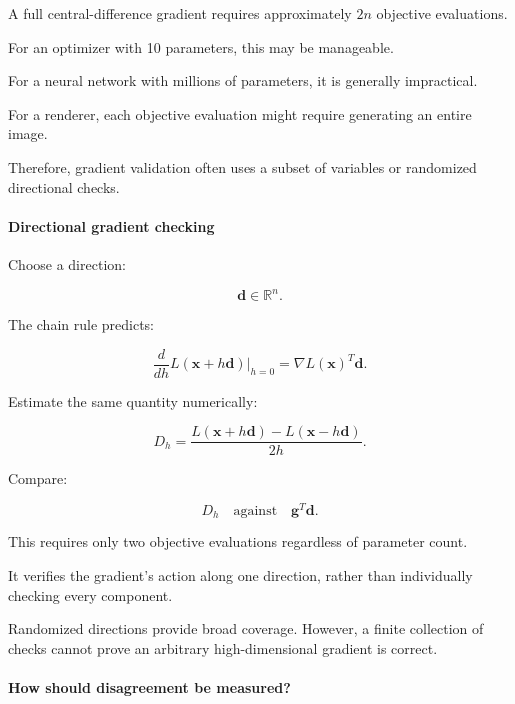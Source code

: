 \hypertarget{02-foundations-ii-ch022-why-checking-an-entire-gradient-can-be-expensive}{}

A full central-difference gradient requires approximately \(2n\) objective evaluations.

For an optimizer with 10 parameters, this may be manageable.

For a neural network with millions of parameters, it is generally impractical.

For a renderer, each objective evaluation might require generating an entire image.

Therefore, gradient validation often uses a subset of variables or randomized directional checks.

\paragraph{Directional gradient checking}\label{02-foundations-ii-ch022-directional-gradient-checking}

\hypertarget{02-foundations-ii-ch022-directional-gradient-checking}{}

Choose a direction:

\[
\mathbf d\in\mathbb R^n.
\]

The chain rule predicts:

\[
\frac{d}{dh}L(\mathbf x+h\mathbf d)\bigg|_{h=0} = \nabla L(\mathbf x)^T\mathbf d.
\]

Estimate the same quantity numerically:

\[
\boxed{ D_h= \frac{ L(\mathbf x+h\mathbf d)- L(\mathbf x-h\mathbf d) }{2h} }.
\]

Compare:

\[
D_h \quad\text{against}\quad \mathbf g^T\mathbf d.
\]

This requires only two objective evaluations regardless of parameter count.

It verifies the gradient's action along one direction, rather than individually checking every component.

Randomized directions provide broad coverage. However, a finite collection of checks cannot prove an arbitrary high-dimensional gradient is correct.

\paragraph{How should disagreement be measured?}\label{02-foundations-ii-ch022-how-should-disagreement-be-measured}

